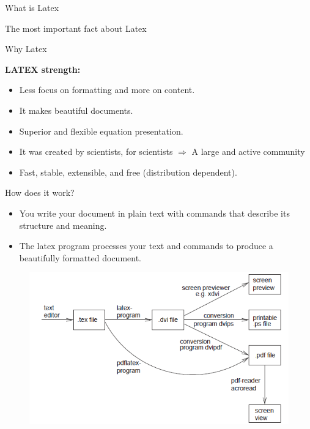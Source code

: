 \documentclass{beamer}
\begin{document}
\begin{darkframes}
\begin{frame}[<+->]{What is Latex}
\begin{block}{The most important fact about Latex}
\begin{itemize}
   		\end{itemize}
   	\end{block}
   \end{frame}
   
   
   \begin{frame}[<+->]{Why Latex}
   	
   	\begin{block}{\textbf {LATEX strength:}}
   		\begin{itemize}
   			\item Less focus on formatting and more on content.
   			\item It makes beautiful documents.
   			\item Superior and flexible equation presentation.
   			\item It was created by scientists, for scientists $\Rightarrow$ A large and active community
   			\item Fast, stable, extensible, and free (distribution dependent).
   		\end{itemize}
   	\end{block}
   \end{frame}
   
   \begin{frame}{How does it work?}
   	
   	
   	\begin{itemize}
   		\item You write your document in plain text with commands that describe its structure and meaning.
   		\item  The latex program processes your text and commands to produce a beautifully formatted document.
   	\end{itemize}
   	\pause
   	\begin{figure}
   		\includegraphics[scale=0.45]{images/latexhowthis}
   	\end{figure}
   \end{frame}
   

\end{darkframes}
\end{document}
